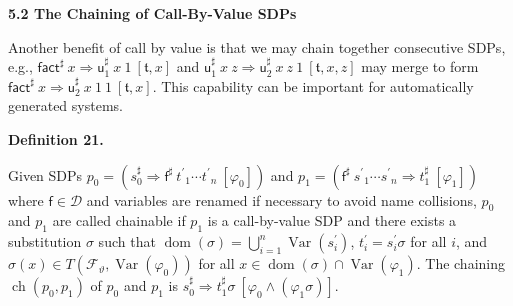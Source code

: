  
 
\par\medskip\noindent\textbf{5.2 The Chaining of Call-By-Value SDPs}\par
 
 
Another benefit of call by value is that we may chain together consecutive SDPs, e.g., ${{\mathsf{fact}^{\sharp}}\ {x}}\Rightarrow{{{\mathsf{u}_{1}^{\sharp}}\ {x}}\ {1}}\ [\mathfrak{t},x]$ and ${{{\mathsf{u}_{1}^{\sharp}}\ {x}}\ {z}}\Rightarrow{{{{\mathsf{u}_{2}^{\sharp}}\ {x}}\ {z}}\ {1}}\ [\mathfrak{t},x,z]$ may merge to form ${{\mathsf{fact}^{\sharp}}\ {x}}\Rightarrow{{{{\mathsf{u}_{2}^{\sharp}}\ {x}}\ {1}}\ {1}}\ [\mathfrak{t},x]$. This capability can be important for automatically generated systems.\par
 
 
 
\par\medskip\noindent\textbf{Definition 21.}\par
 
 
Given SDPs $p_{0}=({s_{0}^{\sharp}}\Rightarrow{{\mathsf{f}^{\sharp}}\ {{t^{\prime}}_{1}\cdots{t^{\prime}}_{n}}}\ [\varphi_{0}])$ and $p_{1}=({{\mathsf{f}^{\sharp}}\ {{s^{\prime}}_{1}\cdots{s^{\prime}}_{n}}}\Rightarrow{t_{1}^{\sharp}}\ [\varphi_{1}])$ where $\mathsf{f}\in\mathcal{D}$ and variables are renamed if necessary to avoid name collisions, $p_{0}$ and $p_{1}$ are called chainable if $p_{1}$ is a call-by-value SDP and there exists a substitution $\sigma$ such that $\operatorname{dom}(\sigma)=\bigcup_{i=1}^{n}\operatorname{Var}(s_{i}^{\prime})$, $t_{i}^{\prime}=s_{i}^{\prime}\sigma$ for all $i$, and $\sigma(x)\in T({\mathcal{F}}_{\vartheta},\operatorname{Var}(\varphi_{0}))$ for all $x\in\operatorname{dom}(\sigma)\cap\operatorname{Var}(\varphi_{1})$. The chaining $\operatorname{ch}(p_{0},p_{1})$ of $p_{0}$ and $p_{1}$ is ${s_{0}^{\sharp}}\Rightarrow{t_{1}^{\sharp}\sigma}\ [\varphi_{0}\wedge(\varphi_{1}\sigma)]$.\par
 
 
 
 
